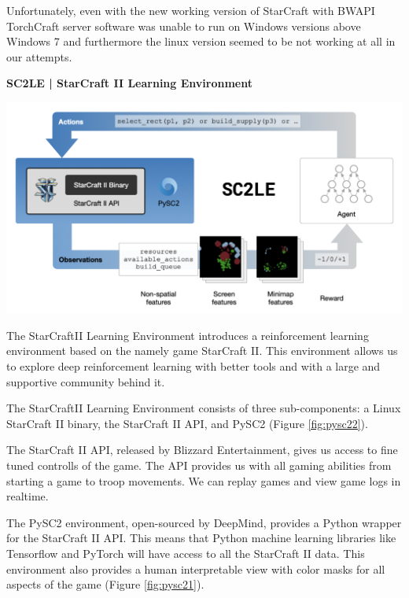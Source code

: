 \documentclass[a4paper,12pt]{report}
\begin{document}
Unfortunately, even with the new working version of StarCraft with BWAPI TorchCraft server software was unable to run on Windows versions above Windows 7 and furthermore the linux version seemed to be not working at all in our attempts.

\Large\textbf{SC2LE | StarCraft II Learning Environment}\normalsize
\begin{center}
    \captionsetup{type=figure}
    \includegraphics[width=1\linewidth]{media/pysc2-2.png}
    \label{fig:pysc22}
\end{center}

The StarCraftII Learning Environment introduces a reinforcement learning environment based on the namely game StarCraft II. This environment allows us to explore deep reinforcement learning with better tools and with a large and supportive community behind it.

The StarCraftII Learning Environment consists of three sub-components: a Linux StarCraft II binary, the StarCraft II API, and PySC2 (Figure \ref{fig:pysc22}).

The StarCraft II API, released by Blizzard Entertainment, gives us access to fine tuned controlls of the game. The API provides us with all gaming abilities from starting a game to troop movements. We can replay games and view game logs in realtime.

The PySC2 environment, open-sourced by DeepMind, provides a Python wrapper for the StarCraft II API. This means that Python machine learning libraries like Tensorflow and PyTorch will have access to all the StarCraft II data. This environment also provides a human interpretable view with color masks for all aspects of the game (Figure \ref{fig:pysc21}).
\end{document}
